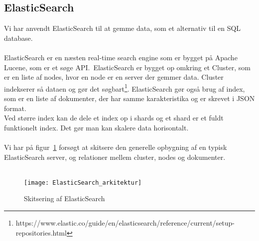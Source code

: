 \subsection{ElasticSearch}
Vi har anvendt ElasticSearch til at gemme data, som et alternativ til en SQL database.
\\\\
ElasticSearch er en næsten real-time search engine som er bygget på Apache Lucene, som er et søge API.\
ElasticSearch er bygget op omkring et Cluster, som er en liste af nodes, hvor en node er en server der gemmer data. Cluster indekserer så dataen og gør det søgbart\footnote{https://www.elastic.co/guide/en/elasticsearch/reference/current/setup-repositories.html}.
ElasticSearch gør også brug af index, som er en liste af dokumenter, der har samme karakteristika og er skrevet i JSON format.
\\
Ved større index kan de dele et index op i shards og et shard er et fuldt funktionelt index. Det gør man kan skalere data horisontalt.
\\\\
Vi har på figur~\ref{fig:elasticsearch-arkitektur} forsøgt at skitsere den generelle opbygning af en typisk ElasticSearch server, og relationer mellem cluster, nodes og dokumenter.
\\\\
\begin{figure}[H]
    \texttt{[image: ElasticSearch\_arkitektur]}
    \caption{Skitsering af ElasticSearch}
    \label{fig:elasticsearch-arkitektur}
\end{figure}
